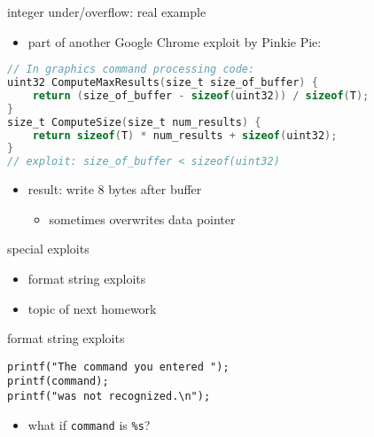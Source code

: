 \begin{frame}[fragile,label=intUOEx]{integer under/overflow: real example}
    \begin{itemize}
        \item part of another Google Chrome exploit by Pinkie Pie:
    \end{itemize}
    \begin{lstlisting}[language=C,style=small,morekeywords={uint32,size_t}]
// In graphics command processing code:
uint32 ComputeMaxResults(size_t size_of_buffer) {
    return (size_of_buffer - sizeof(uint32)) / sizeof(T);
} 
size_t ComputeSize(size_t num_results) {
    return sizeof(T) * num_results + sizeof(uint32);
} 
// exploit: size_of_buffer < sizeof(uint32)
\end{lstlisting}
    \begin{itemize}
        \item result: write 8 bytes after buffer 
            \begin{itemize}
                \item sometimes overwrites data pointer
            \end{itemize}
    \end{itemize}
\end{frame}

\begin{frame}{special exploits}
    \begin{itemize}
        \item format string exploits
        \item topic of next homework
    \end{itemize}
\end{frame}

\begin{frame}[fragile,label=formatStringIntro]{format string exploits}
\lstset{language=C}
\begin{lstlisting}
printf("The command you entered ");
printf(command);
printf("was not recognized.\n");
\end{lstlisting}
    \begin{itemize}
        \item<2> what if \texttt{command} is {\tt \%s}?
    \end{itemize}
\end{frame}


